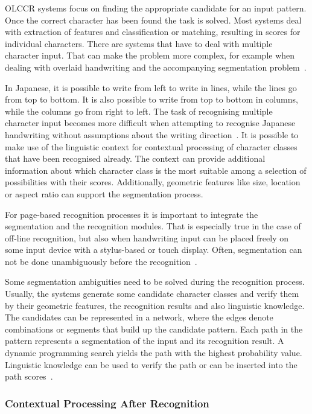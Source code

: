 OLCCR systems focus on finding the appropriate candidate for an input pattern.
Once the correct character has been found the task is solved. Most systems
deal with extraction of features and classification or matching, resulting in 
scores for individual characters. There are systems that have to deal with 
multiple character input. That can make the problem more complex, 
for example when dealing with overlaid handwriting and the accompanying 
segmentation problem~. 

In Japanese, it is possible to write from left to write in lines, 
while the lines go from top to bottom. It is also possible to write from top 
to bottom in columns, while the columns go from right to left. 
The task of recognising multiple character input becomes more difficult
when attempting to recognise Japanese handwriting without assumptions about the
writing direction~. 
It is possible to make use of the linguistic context for contextual 
processing of character classes that have been recognised already.
The context can provide additional information about which character class is
the most suitable among a selection of possibilities with their scores.
Additionally, geometric features like size, location or aspect ratio can 
support the segmentation process. 

For page-based recognition processes it is important to integrate the 
segmentation and the recognition modules. 
That is especially true in the case of off-line recognition, 
but also when handwriting input can be placed freely on some
input device with a stylus-based or touch display.
Often, segmentation can not be done unambiguously before the 
recognition~.

Some segmentation ambiguities need to be solved during the recognition process.
Usually, the systems generate some candidate character classes and verify them
by their geometric features, the recognition results and also linguistic 
knowledge. The candidates can be represented in a network, where the edges denote
combinations or segments that build up the candidate pattern.
Each path in the pattern represents a segmentation of the input and its 
recognition result. A dynamic programming search yields the path with the highest
probability value. Linguistic knowledge can be used to verify the path or
can be inserted into the path scores~.

\subsubsection{Contextual Processing After Recognition}
\label{sec:olccr:contextualprocessingafter}

